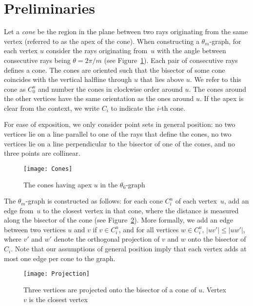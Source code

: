 \documentclass[12pt]{article}
\begin{document}
\section{Preliminaries}
\label{sec:Preliminaries}
Let a \emph{cone} be the region in the plane between two rays originating from the same vertex (referred to as the apex of the cone). When constructing a $\theta_m$-graph, for each vertex $u$ consider the rays originating from~$u$ with the angle between consecutive rays being $\theta = 2 \pi / m$ (see Figure~\ref{fig:Cones}). Each pair of consecutive rays defines a cone. The cones are oriented such that the bisector of some cone coincides with the vertical halfline through $u$ that lies above $u$. We refer to this cone as $C^u_0$ and number the cones in clockwise order around $u$. The cones around the other vertices have the same orientation as the ones around $u$. If the apex is clear from the context, we write $C_i$ to indicate the $i$-th cone. 

For ease of exposition, we only consider point sets in general position: no two vertices lie on a line parallel to one of the rays that define the cones, no two vertices lie on a line perpendicular to the bisector of one of the cones, and no three points are collinear. 

\begin{figure}[ht]
  \begin{center}
    \texttt{[image: Cones]}
  \end{center}
  \caption{The cones having apex $u$ in the $\theta_6$-graph}
  \label{fig:Cones}
\end{figure}

The $\theta_m$-graph is constructed as follows: for each cone $C^u_i$ of each vertex~$u$, add an edge from~$u$ to the closest vertex in that cone, where the distance is measured along the bisector of the cone (see Figure~\ref{fig:Projection}). More formally, we add an edge between two vertices $u$ and $v$ if $v \in C^u_i$, and for all vertices $w \in C^u_i$, $|u v'| \leq |u w'|$, where $v'$ and $w'$ denote the orthogonal projection of $v$ and $w$ onto the bisector of $C_i$. Note that our assumptions of general position imply that each vertex adds at most one edge per cone to the graph. 

\begin{figure}[ht]
  \begin{center}
    \texttt{[image: Projection]}
  \end{center}
  \caption{Three vertices are projected onto the bisector of a cone of $u$. Vertex $v$ is the closest vertex}
  \label{fig:Projection}
\end{figure}
\end{document}
